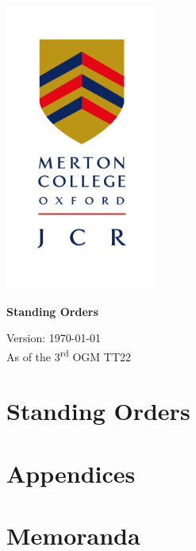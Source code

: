 \documentclass{standingorders}
\begin{document}
	\thispagestyle{empty}
	\begin{center}
		\includegraphics[width=5cm]{mertoncollegejcr}
		\begin{vplace}[0.1] \Huge  
			\textbf{Standing Orders}
		\end{vplace}
		{ {\Large
			Version: \today}\\
			\small As of the 3\textsuperscript{rd} OGM TT22
			
		}
		\vfill
	\end{center}
	\cleardoublepage
	\frontmatter
	\tableofcontents
	
	
	\mainmatter
	\part{Standing Orders}
	
	
	
	
	
	
	
	
	
	
	
	\part{Appendices}
	\begin{appendices}
		
        
		
		
		
		
		
	\end{appendices}
	\part{Memoranda}
	\begin{appendices}
	\end{appendices}
\end{document}
